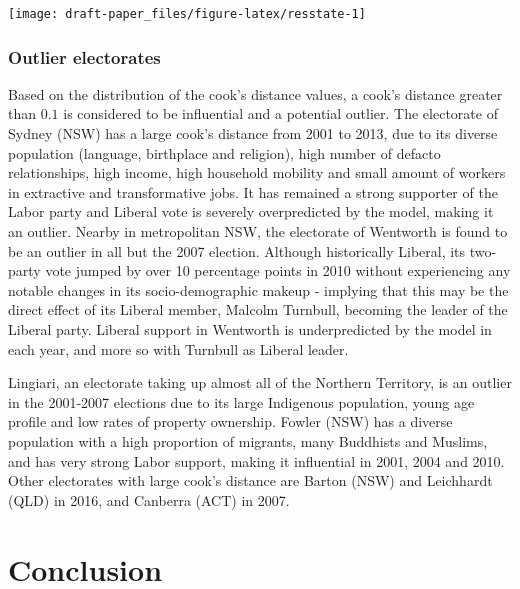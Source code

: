\documentclass[11pt,a4paper,]{article}
\let\origfigure\figure
\let\endorigfigure\endfigure
\renewenvironment{figure}[1][2] {
    \expandafter\origfigure\expandafter[H]
} {
    \endorigfigure
}
\begin{document}
\begin{figure}[h]

{\centering \texttt{[image: draft-paper\_files/figure-latex/resstate-1]} 

}

\caption{Boxplot of residuals by state with jittered points.}\label{fig:resstate}
\end{figure}

\hypertarget{outlier-electorates}{%
\subsubsection{Outlier electorates}\label{outlier-electorates}}

Based on the distribution of the cook's distance values, a cook's distance greater than \(0.1\) is considered to be influential and a potential outlier. The electorate of Sydney (NSW) has a large cook's distance from 2001 to 2013, due to its diverse population (language, birthplace and religion), high number of defacto relationships, high income, high household mobility and small amount of workers in extractive and transformative jobs. It has remained a strong supporter of the Labor party and Liberal vote is severely overpredicted by the model, making it an outlier. Nearby in metropolitan NSW, the electorate of Wentworth is found to be an outlier in all but the 2007 election. Although historically Liberal, its two-party vote jumped by over 10 percentage points in 2010 without experiencing any notable changes in its socio-demographic makeup - implying that this may be the direct effect of its Liberal member, Malcolm Turnbull, becoming the leader of the Liberal party. Liberal support in Wentworth is underpredicted by the model in each year, and more so with Turnbull as Liberal leader.

Lingiari, an electorate taking up almost all of the Northern Territory, is an outlier in the 2001-2007 elections due to its large Indigenous population, young age profile and low rates of property ownership. Fowler (NSW) has a diverse population with a high proportion of migrants, many Buddhists and Muslims, and has very strong Labor support, making it influential in 2001, 2004 and 2010. Other electorates with large cook's distance are Barton (NSW) and Leichhardt (QLD) in 2016, and Canberra (ACT) in 2007.

\hypertarget{conclusion}{%
\section{Conclusion}\label{conclusion}}
\end{document}
